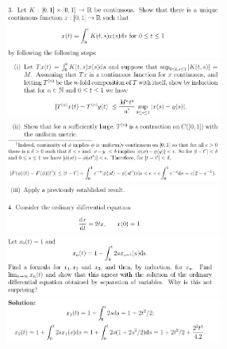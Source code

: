 \documentclass[8pt,landscape]{article}
\begin{document}
\begin{multicols}{3}
    \includegraphics[width=270]{113.png} \\
    \includegraphics[width=270]{114.png} \\
    \includegraphics[width=270]{115.png} \\
    \includegraphics[width=270]{116.png} \\
    \includegraphics[width=270]{117.png} \\
    \includegraphics[width=270]{118.png} \\

\end{multicols}
\end{document}
